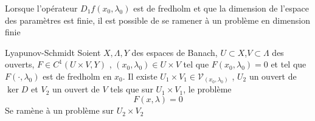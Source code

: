 \documentclass[a4paper,12pt,oneside,titlepage]{article}
\theoremstyle{definition}
\theoremstyle{plain}
\begin{document}
Lorsque l'opérateur $D_1f(x_0,\lambda_0)$ est de fredholm et que la dimension de l'espace des paramètres est finie, il est possible de se ramener à un problème en dimension finie
\begin{theobox}{Lyapunov-Schmidt}{}\label{LP-redux}
Soient $X,\Lambda,Y$ des espaces de 
Banach, $U\subset X$,$V\subset \Lambda$ 
des ouverts, $F\in C^1(U\times V,Y)$ , $(x_0,\lambda_0)\in U\times V$ tel que $F(x_0,\lambda_0)=0$ et tel que $F(\cdot ,\lambda_0)$ est de fredholm en $x_0$. Il existe $U_1\times V_1 \in\mathcal{V}_{(x_0,\lambda_0)}$ , $U_2$ un ouvert de $\ker D$ et $V_2$ un ouvert de $V$ 
tels que sur $U_1\times V_1$, le problème
\begin{equation*}
    F(x,\lambda)=0 
\end{equation*} 
Se ramène à un problème  sur $U_2\times V_2$
\end{theobox}
\end{document}
